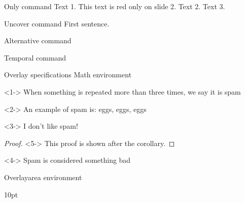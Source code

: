 \documentclass{beamer}
\begin{document}
\begin{frame}{Only command}
  Text 1.
    This text is red only on slide 2.
  Text 2.
  Text 3.
\end{frame}

\begin{frame}{Uncover command}
  First sentence.
\end{frame}

\begin{frame}{Alternative command}
\end{frame}

\begin{frame}{Temporal command}
\end{frame}


\begin{frame}{Overlay specifications Math environment}
  \begin{definition}<1->
    When something is repeated more than three times, we say it is spam
  \end{definition}
  \begin{example}<2->
    An example of spam is: eggs, eggs, eggs
  \end{example}
  \begin{theorem}<3->
    I don’t like spam!
  \end{theorem}
  \begin{proof}<5->
    This proof is shown after the corollary.
  \end{proof}
  \begin{corollary}<4->
    Spam is considered something bad
  \end{corollary}
\end{frame}


\begin{frame}{Overlayarea environment}
  \begin{overlayarea}
    {
      \linewidth  %
    }
    {
      10pt %
    }
  \end{overlayarea}
\end{frame}
\end{document}
